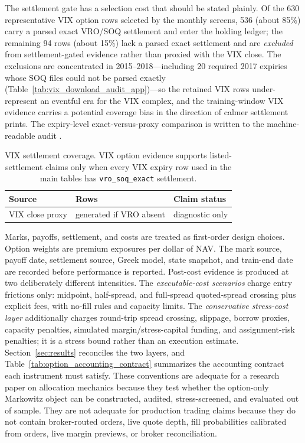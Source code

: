 The settlement gate has a selection cost that should be stated plainly. Of the 630
representative VIX option rows selected by the monthly screens, 536 (about 85\%) carry a
parsed exact VRO/SOQ settlement and enter the holding ledger; the remaining 94 rows (about
15\%) lack a parsed exact settlement and are \emph{excluded} from settlement-gated
evidence rather than proxied with the VIX close. The exclusions are concentrated in
2015--2018---including 20 required 2017 expiries whose SOQ files could not be parsed
exactly (Table~\ref{tab:vix_download_audit_app})---so the retained VIX rows
under-represent an eventful era for the VIX complex, and the training-window VIX evidence
carries a potential coverage bias in the direction of calmer settlement prints. The
expiry-level exact-versus-proxy comparison is written to the machine-readable audit
.

\begin{table}[H]
\centering
\scriptsize
{}
  {\resizebox{0.62\textwidth}{!}{}}
  {\begin{tabular}{lll}\toprule Source & Rows & Claim status \\\midrule
  VIX close proxy & generated if VRO absent & diagnostic only \\\bottomrule\end{tabular}}
\caption{VIX settlement coverage. VIX option evidence supports listed-settlement claims
only when every VIX expiry row used in the main tables has \texttt{vro\_soq\_exact}
settlement.}
\label{tab:vix_settlement}
\end{table}

Marks, payoffs, settlement, and costs are treated as first-order design choices. Option
weights are premium exposures per dollar of NAV. The mark source, payoff date, settlement
source, Greek model, state snapshot, and train-end date are recorded before performance is
reported. Post-cost evidence is produced at two deliberately different intensities. The
\emph{executable-cost scenarios} charge entry frictions only: midpoint, half-spread, and
full-spread quoted-spread crossing plus explicit fees, with no-fill rules and capacity
limits. The \emph{conservative stress-cost layer} additionally charges round-trip spread
crossing, slippage, borrow proxies, capacity penalties, simulated margin/stress-capital
funding, and assignment-risk penalties; it is a stress bound rather than an execution
estimate. Section~\ref{sec:results} reconciles the two layers, and
Table~\ref{tab:option_accounting_contract} summarizes the accounting contract each
instrument must satisfy. These conventions are adequate for a research paper on
allocation mechanics because they test whether the option-only Markowitz object can be
constructed, audited, stress-screened, and evaluated out of sample. They are not adequate
for production trading claims because they do not contain broker-routed orders, live quote
depth, fill probabilities calibrated from orders, live margin previews, or broker
reconciliation.

